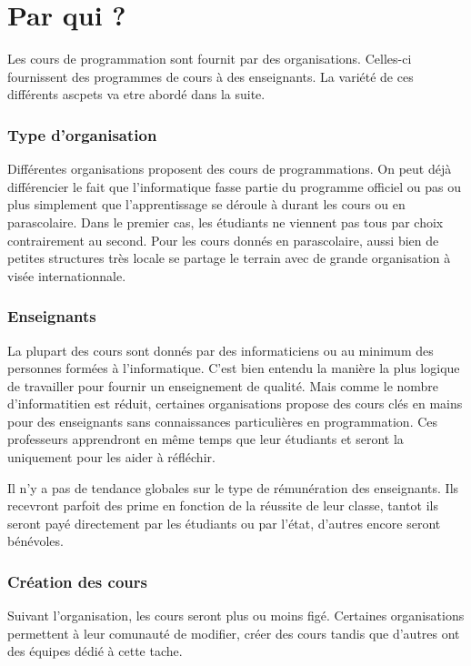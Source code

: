 \section{Par qui ?}
Les cours de programmation sont fournit par des organisations. Celles-ci fournissent des programmes de cours à des enseignants. La variété de ces différents ascpets va etre abordé dans la suite.

\subsubsection{Type d'organisation}
Différentes organisations proposent des cours de programmations.
On peut déjà différencier le fait que l'informatique fasse partie du programme officiel ou pas ou plus simplement que l'apprentissage se déroule à durant les cours ou en parascolaire. Dans le premier cas, les étudiants ne viennent pas tous par choix contrairement au second. Pour les cours donnés en parascolaire, aussi bien de petites structures très locale se partage le terrain avec de grande organisation à visée internationnale.

\subsubsection{Enseignants}
La plupart des cours sont donnés par des informaticiens ou au minimum des personnes formées à l'informatique. C'est bien entendu la manière la plus logique de travailler pour fournir un enseignement de qualité. Mais comme le nombre d'informatitien est réduit, certaines organisations propose des cours clés en mains pour des enseignants sans connaissances particulières en programmation. Ces professeurs apprendront en même temps que leur étudiants et seront la uniquement pour les aider à réfléchir.

Il n'y a pas de tendance globales sur le type de rémunération des enseignants. Ils recevront parfoit des prime en fonction de la réussite de leur classe, tantot ils seront payé directement par les étudiants ou par l'état, d'autres encore seront bénévoles.

\subsubsection{Création des cours}
Suivant l'organisation, les cours seront plus ou moins figé. Certaines organisations permettent à leur comunauté de modifier, créer des cours tandis que d'autres ont des équipes dédié à cette tache.
